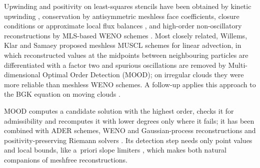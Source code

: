 \documentclass[smallextended]{svjour3}
\numberwithin{equation}{section}
\begin{document}
Upwinding and positivity on least-squares stencils have been obtained by kinetic upwinding \cite{Ghosh1995,Ramesh2001,Chandrashekar2004}, conservation by antisymmetric meshless face coefficients, closure conditions or approximate local flux balances \cite{Chiu2011,Chiu2012,Huh2018,Suchde2017,SuchdeThesis2018,Katz2009}, and high-order non-oscillatory reconstructions by MLS-based WENO schemes \cite{Avesani2014}. Most closely related, Willems, Klar and Samaey \cite{Willems2025,WillemsCode2025} proposed meshless MUSCL schemes for linear advection, in which reconstructed values at the midpoints between neighbouring particles are differentiated with a factor two and spurious oscillations are removed by Multi-dimensional Optimal Order Detection (MOOD); on irregular clouds they were more reliable than meshless WENO schemes. A follow-up applies this approach to the BGK equation on moving clouds \cite{Willems2025BGK}.

MOOD \cite{Clain2011,Diot2012,Diot2013} computes a candidate solution with the highest order, checks it for admissibility and recomputes it with lower degrees only where it fails; it has been combined with ADER schemes, WENO and Gaussian-process reconstructions and positivity-preserving Riemann solvers \cite{Loubere2014,Boscheri2015,Farmakis2020,Bourgeois2022,Chan2021}. Its detection step needs only point values and local bounds, like a~priori slope limiters \cite{BarthJespersen1989,Venkatakrishnan1995,Hubbard1999}, which makes both natural companions of meshfree reconstructions.
\end{document}
